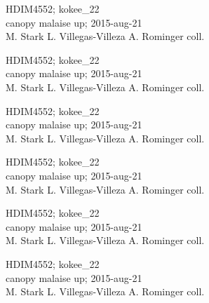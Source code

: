 \documentclass[2pt]{extarticle}
\begin{document}
\noindent
\parbox{0.16\textwidth}{\tiny \raggedright \rule[-0.3\baselineskip]{0pt}{10pt}HDIM4552; kokee\_22\\ canopy malaise up; 2015-aug-21\\ M. Stark L. Villegas-Villeza A. Rominger coll.}
\parbox{0.16\textwidth}{\tiny \raggedright \rule[-0.3\baselineskip]{0pt}{10pt}HDIM4552; kokee\_22\\ canopy malaise up; 2015-aug-21\\ M. Stark L. Villegas-Villeza A. Rominger coll.}
\parbox{0.16\textwidth}{\tiny \raggedright \rule[-0.3\baselineskip]{0pt}{10pt}HDIM4552; kokee\_22\\ canopy malaise up; 2015-aug-21\\ M. Stark L. Villegas-Villeza A. Rominger coll.}
\parbox{0.16\textwidth}{\tiny \raggedright \rule[-0.3\baselineskip]{0pt}{10pt}HDIM4552; kokee\_22\\ canopy malaise up; 2015-aug-21\\ M. Stark L. Villegas-Villeza A. Rominger coll.}
\parbox{0.16\textwidth}{\tiny \raggedright \rule[-0.3\baselineskip]{0pt}{10pt}HDIM4552; kokee\_22\\ canopy malaise up; 2015-aug-21\\ M. Stark L. Villegas-Villeza A. Rominger coll.}
\parbox{0.16\textwidth}{\tiny \raggedright \rule[-0.3\baselineskip]{0pt}{10pt}HDIM4552; kokee\_22\\ canopy malaise up; 2015-aug-21\\ M. Stark L. Villegas-Villeza A. Rominger coll.} \\ 
\vspace{0.001in} 
\end{document}
